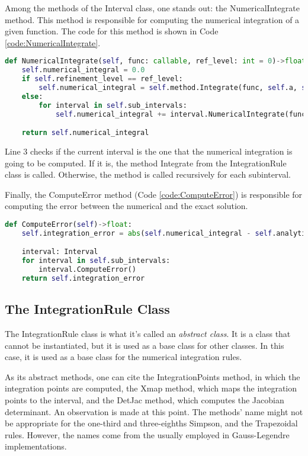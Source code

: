 Among the methods of the Interval class, one stands out: the NumericalIntegrate method. This method is responsible for computing the numerical integration of a given function. The code for this method is shown in Code \ref{code:NumericalIntegrate}. 
\begin{lstlisting}[language=python, caption={NumericalIntegrate Method.}, label={code:NumericalIntegrate}]
def NumericalIntegrate(self, func: callable, ref_level: int = 0)->float:
    self.numerical_integral = 0.0
    if self.refinement_level == ref_level:
        self.numerical_integral = self.method.Integrate(func, self.a, self.b, self.n_points)
    else:
        for interval in self.sub_intervals:
            self.numerical_integral += interval.NumericalIntegrate(func, ref_level)

    return self.numerical_integral
\end{lstlisting}

Line 3 checks if the current interval is the one that the numerical integration is going to be computed. If it is, the method Integrate from the IntegrationRule class is called. Otherwise, the method is called recursively for each subinterval.

Finally, the ComputeError method (Code \ref{code:ComputeError}) is responsible for computing the error between the numerical and the exact solution.
\begin{lstlisting}[language=python, caption={ComputeError Method}, label={code:ComputeError}]
def ComputeError(self)->float:
    self.integration_error = abs(self.numerical_integral - self.analytic_integral)

    interval: Interval
    for interval in self.sub_intervals:
        interval.ComputeError()
    return self.integration_error
\end{lstlisting}

\subsection{The IntegrationRule Class}
The IntegrationRule class is what it's called an \textit{abstract class}. It is a class that cannot be instantiated, but it is used as a base class for other classes. In this case, it is used as a base class for the numerical integration rules. 

As its abstract methods, one can cite the IntegrationPoints method, in which the integration points are computed, the Xmap method, which maps the integration points to the interval, and the DetJac method, which computes the Jacobian determinant. An observation is made at this point. The methods' name might not be appropriate for the one-third and three-eighths Simpson, and the Trapezoidal rules. However, the names come from the usually employed in Gauss-Legendre implementations. 

